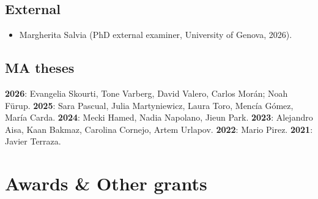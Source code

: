 \documentclass[a4paper, 12pt]{article}
\begin{document}
\subsection*{External}

\begin{itemize}[leftmargin=*, nolistsep]
	\item Margherita Salvia (PhD external examiner, University of Genova, 2026).
\end{itemize}

\subsection*{MA theses}

\textbf{2026}: Evangelia Skourti, Tone Varberg, David Valero, Carlos Morán; Noah Fürup.
\textbf{2025}: Sara Pascual, Julia Martyniewicz, Laura Toro, Mencía Gómez, María Carda.
\textbf{2024}: Mecki Hamed, Nadia Napolano, Jieun Park.
\textbf{2023}: Alejandro Aisa, Kaan Bakmaz, Carolina Cornejo, Artem Urlapov.
\textbf{2022}: Mario Pirez.
\textbf{2021}: Javier Terraza.

\section*{Awards \& Other grants}

\end{document}
